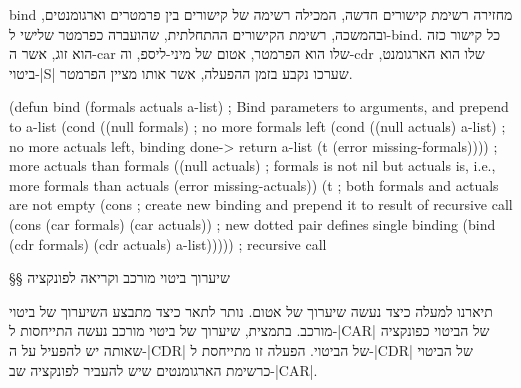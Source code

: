 bind מחזירה רשימת קישורים חדשה, המכילה רשימה של קישורים בין פרמטרים וארגומנטים,
ובהמשכה, רשימת הקישורים ההתחלתית, שהועברה כפרמטר שלישי ל-bind. כל קישור כזה הוא
זוג, אשר ה-car שלו הוא הפרמטר, אטום של מיני-ליספ, וה-cdr שלו הוא הארגומנט, ביטוי-\E|S|
שערכו נקבע בזמן ההפעלה, אשר אותו מציין הפרמטר.

\begin{KERNEL}
(defun bind (formals actuals a-list) ; Bind parameters to arguments, and prepend to a-list
  (cond ((null formals) ; no more formals left
        (cond ((null actuals) a-list) ; no more actuals left, binding done-> return a-list
              (t (error missing-formals)))) ; more actuals than formals
        ((null actuals) ; formals is not nil but actuals is, i.e., more formals than actuals
          (error missing-actuals))
        (t ; both formals and actuals are not empty
          (cons ; create new binding and prepend it to result of recursive call
            (cons (car formals) (car actuals)) ; new dotted pair defines single binding
            (bind (cdr formals) (cdr actuals) a-list))))) ; recursive call
\end{KERNEL}

§§ שיערוך ביטוי מורכב וקריאה לפונקציה

תיארנו למעלה כיצד נעשה שיערוך של אטום. נותר לתאר כיצד מתבצע השיערוך של ביטוי
מורכב. בתמצית, שיערוך של ביטוי מורכב נעשה התייחסות ל-\E|CAR| של הביטוי כפונקציה
שאותה יש להפעיל על ה-\E|CDR| של הביטוי. הפעלה זו מתייחסת ל-\E|CDR| של הביטוי
כרשימת הארגומנטים שיש להעביר לפונקציה שב-\E|CAR|.


